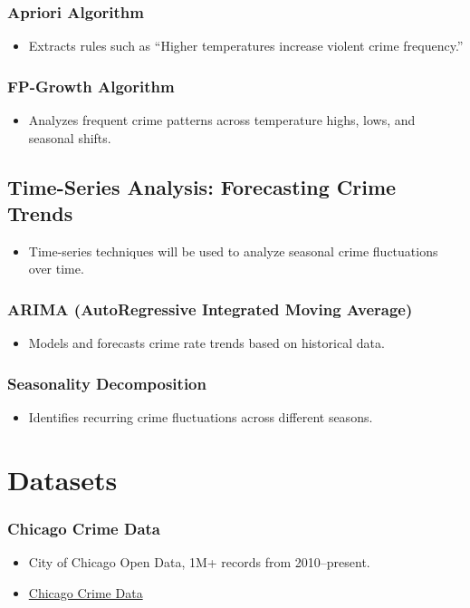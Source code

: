 \documentclass[sigconf,twocolumn,11pt]{acmart}
\begin{document}
\subsubsection{Apriori Algorithm}
\begin{itemize}
    \item Extracts rules such as “Higher temperatures increase violent crime frequency.”
\end{itemize}
\subsubsection{FP-Growth Algorithm}
\begin{itemize}
    \item Analyzes frequent crime patterns across temperature highs, lows, and seasonal shifts.
\end{itemize}

\subsection{Time-Series Analysis: Forecasting Crime Trends}
\begin{itemize}
    \item Time-series techniques will be used to analyze seasonal crime fluctuations over time.
\end{itemize}
\subsubsection{ARIMA (AutoRegressive Integrated Moving Average)}
\begin{itemize}
    \item Models and forecasts crime rate trends based on historical data.
\end{itemize}
\subsubsection{Seasonality Decomposition}
\begin{itemize}
    \item Identifies recurring crime fluctuations across different seasons.
\end{itemize}

\section{Datasets}
\subsubsection{\textbf{Chicago Crime Data}}
\begin{itemize}
    \item City of Chicago Open Data, 1M+ records from 2010--present.
    \item\href{https://data.cityofchicago.org/Public-Safety/Crimes-2001-to-Present/ijzp-q8t2/about_data}{Chicago Crime Data}
\end{itemize}
\end{document}
